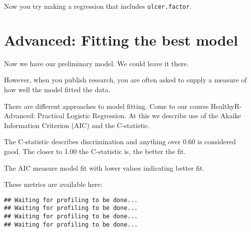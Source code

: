 \documentclass[]{book}
\makeatletter
\newenvironment{Shaded}{\begin{snugshade}}{\end{snugshade}}
\newcommand{\KeywordTok}[1]{\textcolor[rgb]{0.13,0.29,0.53}{\textbf{#1}}}
\newcommand{\DataTypeTok}[1]{\textcolor[rgb]{0.13,0.29,0.53}{#1}}
\newcommand{\StringTok}[1]{\textcolor[rgb]{0.31,0.60,0.02}{#1}}
\newcommand{\OtherTok}[1]{\textcolor[rgb]{0.56,0.35,0.01}{#1}}
\newcommand{\OperatorTok}[1]{\textcolor[rgb]{0.81,0.36,0.00}{\textbf{#1}}}
\newcommand{\NormalTok}[1]{#1}
\newenvironment{kframe}{%
\medskip{}
\setlength{\fboxsep}{.8em}
 \def\at@end@of@kframe{}%
 \ifinner\ifhmode%
  \def\at@end@of@kframe{\end{minipage}}%
  \begin{minipage}{\columnwidth}%
 \fi\fi%
 \def\FrameCommand##1{\hskip\@totalleftmargin \hskip-\fboxsep
 \colorbox{shadecolor}{##1}\hskip-\fboxsep
     \hskip-\linewidth \hskip-\@totalleftmargin \hskip\columnwidth}%
 \MakeFramed {\advance\hsize-\width
   \@totalleftmargin\z@ \linewidth\hsize
   \@setminipage}}%
 {\par\unskip\endMakeFramed%
 \at@end@of@kframe}
\renewenvironment{Shaded}{\begin{kframe}}{\end{kframe}}
\theoremstyle{definition}
\theoremstyle{definition}
\theoremstyle{definition}
\theoremstyle{remark}
\makeatother
\begin{document}
Now you try making a regression that includes \texttt{ulcer.factor}.

\newpage

\section{Advanced: Fitting the best
model}\label{advanced-fitting-the-best-model}

Now we have our preliminary model. We could leave it there.

However, when you publish research, you are often asked to supply a
measure of how well the model fitted the data.

There are different approaches to model fitting. Come to our course
HealthyR-Advanced: Practical Logistic Regression. At this we describe
use of the Akaike Information Criterion (AIC) and the C-statistic.

The C-statistic describes discrimination and anything over 0.60 is
considered good. The closer to 1.00 the C-statistic is, the better the
fit.

The AIC measure model fit with lower values indicating better fit.

These metrics are available here:

\begin{Shaded}
\end{Shaded}

\begin{verbatim}
## Waiting for profiling to be done...
## Waiting for profiling to be done...
## Waiting for profiling to be done...
## Waiting for profiling to be done...
\end{verbatim}
\end{document}
